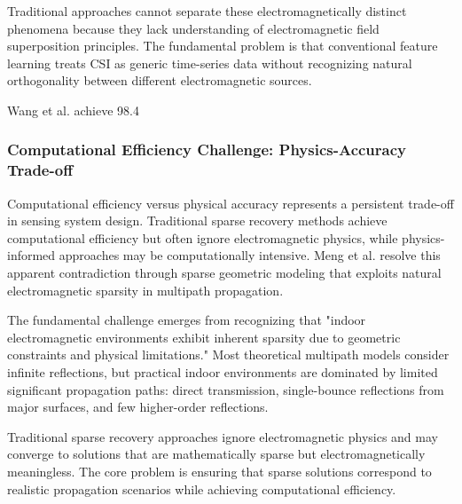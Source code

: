 \documentclass[journal]{IEEEtran}
\begin{document}
Traditional approaches cannot separate these electromagnetically distinct phenomena because they lack understanding of electromagnetic field superposition principles. The fundamental problem is that conventional feature learning treats CSI as generic time-series data without recognizing natural orthogonality between different electromagnetic sources.

Wang et al. achieve 98.4%

\subsubsection{Computational Efficiency Challenge: Physics-Accuracy Trade-off}

Computational efficiency versus physical accuracy represents a persistent trade-off in sensing system design. Traditional sparse recovery methods achieve computational efficiency but often ignore electromagnetic physics, while physics-informed approaches may be computationally intensive. Meng et al. \cite{meng2021wihgr} resolve this apparent contradiction through sparse geometric modeling that exploits natural electromagnetic sparsity in multipath propagation.

The fundamental challenge emerges from recognizing that "indoor electromagnetic environments exhibit inherent sparsity due to geometric constraints and physical limitations." Most theoretical multipath models consider infinite reflections, but practical indoor environments are dominated by limited significant propagation paths: direct transmission, single-bounce reflections from major surfaces, and few higher-order reflections.

Traditional sparse recovery approaches ignore electromagnetic physics and may converge to solutions that are mathematically sparse but electromagnetically meaningless. The core problem is ensuring that sparse solutions correspond to realistic propagation scenarios while achieving computational efficiency.
\end{document}
